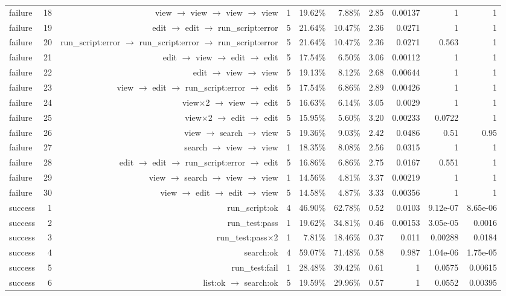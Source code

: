 \begin{tabular}{lrrrrrrrrr}
failure & 18 & view $\to$ view $\to$ view $\to$ view & 1 & 19.62\% & 7.88\% & 2.85 & 0.00137 & 1 & 1 \\
failure & 19 & edit $\to$ edit $\to$ run\_script:error & 5 & 21.64\% & 10.47\% & 2.36 & 0.0271 & 1 & 1 \\
failure & 20 & run\_script:error $\to$ run\_script:error $\to$ run\_script:error & 5 & 21.64\% & 10.47\% & 2.36 & 0.0271 & 0.563 & 1 \\
failure & 21 & edit $\to$ view $\to$ edit $\to$ edit & 5 & 17.54\% & 6.50\% & 3.06 & 0.00112 & 1 & 1 \\
failure & 22 & edit $\to$ view $\to$ view & 5 & 19.13\% & 8.12\% & 2.68 & 0.00644 & 1 & 1 \\
failure & 23 & view $\to$ edit $\to$ run\_script:error $\to$ edit & 5 & 17.54\% & 6.86\% & 2.89 & 0.00426 & 1 & 1 \\
failure & 24 & view$\times$2 $\to$ view $\to$ edit & 5 & 16.63\% & 6.14\% & 3.05 & 0.0029 & 1 & 1 \\
failure & 25 & view$\times$2 $\to$ edit $\to$ edit & 5 & 15.95\% & 5.60\% & 3.20 & 0.00233 & 0.0722 & 1 \\
failure & 26 & view $\to$ search $\to$ view & 5 & 19.36\% & 9.03\% & 2.42 & 0.0486 & 0.51 & 0.95 \\
failure & 27 & search $\to$ view $\to$ view & 1 & 18.35\% & 8.08\% & 2.56 & 0.0315 & 1 & 1 \\
failure & 28 & edit $\to$ edit $\to$ run\_script:error $\to$ edit & 5 & 16.86\% & 6.86\% & 2.75 & 0.0167 & 0.551 & 1 \\
failure & 29 & view $\to$ search $\to$ view $\to$ view & 1 & 14.56\% & 4.81\% & 3.37 & 0.00219 & 1 & 1 \\
failure & 30 & view $\to$ edit $\to$ edit $\to$ view & 5 & 14.58\% & 4.87\% & 3.33 & 0.00356 & 1 & 1 \\
success & 1 & run\_script:ok & 4 & 46.90\% & 62.78\% & 0.52 & 0.0103 & 9.12e-07 & 8.65e-06 \\
success & 2 & run\_test:pass & 1 & 19.62\% & 34.81\% & 0.46 & 0.00153 & 3.05e-05 & 0.0016 \\
success & 3 & run\_test:pass$\times$2 & 1 & 7.81\% & 18.46\% & 0.37 & 0.011 & 0.00288 & 0.0184 \\
success & 4 & search:ok & 4 & 59.07\% & 71.48\% & 0.58 & 0.987 & 1.04e-06 & 1.75e-05 \\
success & 5 & run\_test:fail & 1 & 28.48\% & 39.42\% & 0.61 & 1 & 0.0575 & 0.00615 \\
success & 6 & list:ok $\to$ search:ok & 5 & 19.59\% & 29.96\% & 0.57 & 1 & 0.0552 & 0.00395 \\

\end{tabular}
